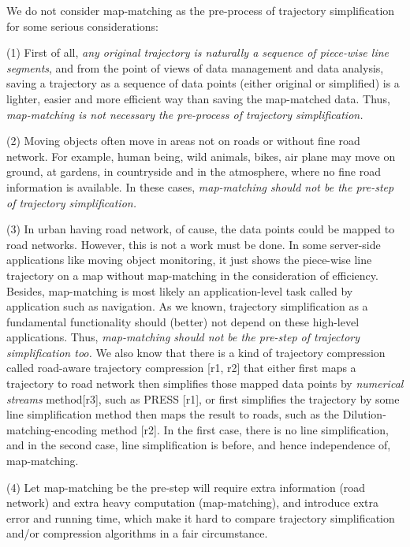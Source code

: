 \documentclass{letter}
\begin{document}
We do not consider map-matching as the pre-process of trajectory simplification for some serious considerations:

(1) First of all, \emph{any original trajectory is naturally a sequence of piece-wise line segments}, and from the point of views of data management and data analysis, saving a trajectory as a sequence of data points (either original or simplified) is a lighter, easier and more efficient way than saving the map-matched data. Thus, \emph{map-matching is not necessary the pre-process of trajectory simplification.} 


(2) Moving objects often move in areas not on roads or without fine road network. For example, human being, wild animals, bikes, air plane may move on ground, at gardens, in countryside and in the atmosphere, where no fine road information is available. In these cases, \emph{map-matching should not be the pre-step of trajectory simplification.}

(3) In urban having road network, of cause, the data points could be mapped to road networks. However, this is not a work must be done. In some server-side applications like moving object monitoring, it just shows the piece-wise line trajectory on a map without map-matching in the consideration of efficiency. Besides, map-matching is most likely an application-level task called by application such as navigation. As we known, trajectory simplification as a fundamental functionality should (better) not depend on these high-level applications. Thus, \emph{map-matching should not be the pre-step of trajectory simplification too.}
%
We also know that there is a kind of trajectory compression called road-aware trajectory compression [r1, r2] that either first maps a trajectory to road network then simplifies those mapped data points by \emph{numerical streams} method[r3], such as PRESS [r1], or first simplifies the trajectory by some line simplification method then maps the result to roads, such as the Dilution-matching-encoding method [r2]. In the first case, there is no line simplification, and in the second case, line simplification is before, and hence independence of, map-matching. 

(4) Let map-matching be the pre-step will require extra information (road network) and extra heavy computation (map-matching), and introduce extra error and running time, which make it hard to compare trajectory simplification and/or compression algorithms in a fair circumstance.
\end{document}

